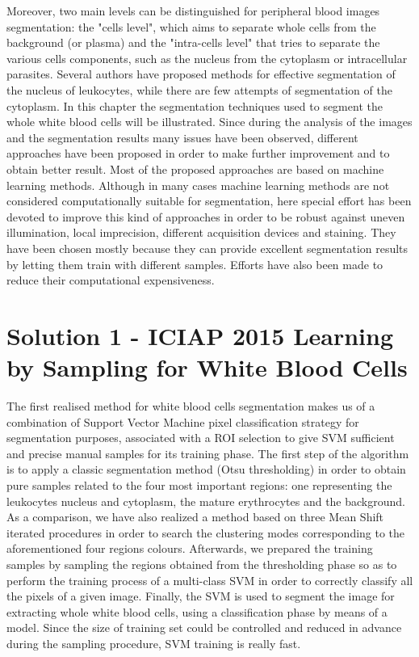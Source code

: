 \documentclass[final,a4paper,12pt,english]{UnicaPhdThesis3}
\begin{document}
Moreover, two main levels can be distinguished for peripheral blood images segmentation: the "cells level", which aims to separate whole cells from the background (or plasma) and the "intra-cells level" that tries to separate the various cells components, such as the nucleus from the cytoplasm or intracellular parasites. Several authors have proposed methods for effective segmentation of the nucleus of leukocytes, while there are few attempts of segmentation of the cytoplasm. In this chapter the segmentation techniques used to segment the whole white blood cells will be illustrated. Since during the analysis of the images and the segmentation results many issues have been observed, different approaches have been proposed in order to make further improvement and to obtain better result. Most of the proposed approaches are based on machine learning methods. Although in many cases machine learning methods are not considered computationally suitable for segmentation, here special effort has been devoted to improve this kind of approaches in order to be robust against uneven illumination, local imprecision, different acquisition devices and staining. They have been chosen mostly because they can provide excellent segmentation results by letting them train with different samples. Efforts have also been made to reduce their computational expensiveness.
  
\section{Solution 1 - ICIAP 2015 Learning by Sampling for White Blood Cells}
The first realised method for white blood cells segmentation makes us of a combination of Support Vector Machine pixel classification strategy for segmentation purposes, associated with a ROI selection to give SVM sufficient and precise manual samples for its training phase. 
The first step of the algorithm is to apply a classic segmentation method (Otsu thresholding) in order to obtain pure samples related to the four most important regions: one representing the leukocytes nucleus and cytoplasm, the mature erythrocytes and the background. As a comparison, we have also realized a method based on three Mean Shift iterated procedures in order to search the clustering modes corresponding to the aforementioned four regions colours. Afterwards, we prepared the training samples by sampling the regions obtained from the thresholding phase so as to perform the training process of a multi-class SVM in order to correctly classify all the pixels of a given image. Finally, the SVM is used to segment the image for extracting whole white blood cells, using a classification phase by means of a model. Since the size of training set could be controlled and reduced in advance during the sampling procedure, SVM training is really fast.
\end{document}
